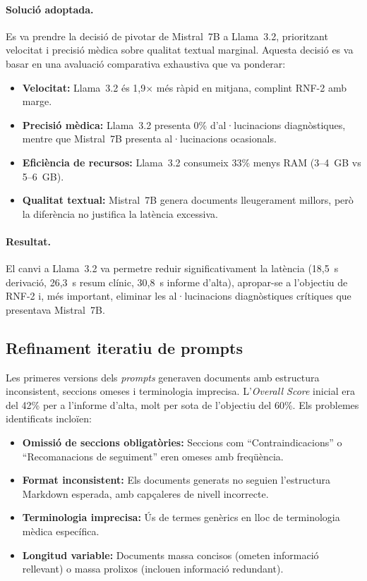 \documentclass[CAT]{TFUOC}%
\begin{document}
\paragraph{Solució adoptada.}
Es va prendre la decisió de pivotar de Mistral~7B a Llama~3.2, prioritzant velocitat i precisió mèdica sobre qualitat textual marginal. Aquesta decisió es va basar en una avaluació comparativa exhaustiva que va ponderar:

\begin{itemize}
    \item \textbf{Velocitat:} Llama~3.2 és 1,9$\times$ més ràpid en mitjana, complint RNF-2 amb marge.
    \item \textbf{Precisió mèdica:} Llama~3.2 presenta 0\% d'al·lucinacions diagnòstiques, mentre que Mistral~7B presenta al·lucinacions ocasionals.
    \item \textbf{Eficiència de recursos:} Llama~3.2 consumeix 33\% menys RAM (3--4~GB vs 5--6~GB).
    \item \textbf{Qualitat textual:} Mistral~7B genera documents lleugerament millors, però la diferència no justifica la latència excessiva.
\end{itemize}

\paragraph{Resultat.}
El canvi a Llama~3.2 va permetre reduir significativament la latència (18,5~s derivació, 26,3~s resum clínic, 30,8~s informe d'alta), apropar-se a l'objectiu de RNF-2 i, més important, eliminar les al·lucinacions diagnòstiques crítiques que presentava Mistral~7B.

\subsection{Refinament iteratiu de prompts}

Les primeres versions dels \textit{prompts} generaven documents amb estructura inconsistent, seccions omeses i terminologia imprecisa. L'\textit{Overall Score} inicial era del 42\% per a l'informe d'alta, molt per sota de l'objectiu del 60\%. Els problemes identificats incloïen:

\begin{itemize}
    \item \textbf{Omissió de seccions obligatòries:} Seccions com ``Contraindicacions'' o ``Recomanacions de seguiment'' eren omeses amb freqüència.
    \item \textbf{Format inconsistent:} Els documents generats no seguien l'estructura Markdown esperada, amb capçaleres de nivell incorrecte.
    \item \textbf{Terminologia imprecisa:} Ús de termes genèrics en lloc de terminologia mèdica específica.
    \item \textbf{Longitud variable:} Documents massa concisos (ometen informació rellevant) o massa prolixos (inclouen informació redundant).
\end{itemize}
\end{document}
